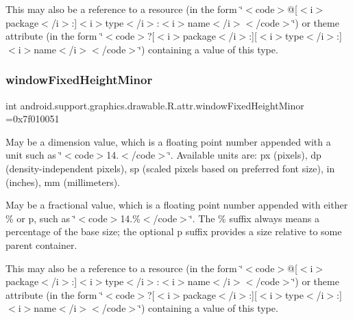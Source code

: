This may also be a reference to a resource (in the form \char`\"{}$<$code$>$@\mbox{[}$<$i$>$package$<$/i$>$\+:\mbox{]}$<$i$>$type$<$/i$>$\+:$<$i$>$name$<$/i$>$$<$/code$>$\char`\"{}) or theme attribute (in the form \char`\"{}$<$code$>$?\mbox{[}$<$i$>$package$<$/i$>$\+:\mbox{]}\mbox{[}$<$i$>$type$<$/i$>$\+:\mbox{]}$<$i$>$name$<$/i$>$$<$/code$>$\char`\"{}) containing a value of this type. \mbox{\label{classandroid_1_1support_1_1graphics_1_1drawable_1_1R_1_1attr_a25c1b23c8a0087d93b397eab05c67450}} 
\subsubsection{\texorpdfstring{window\+Fixed\+Height\+Minor}{windowFixedHeightMinor}}
{\footnotesize\ttfamily int android.\+support.\+graphics.\+drawable.\+R.\+attr.\+window\+Fixed\+Height\+Minor =0x7f010051\hspace{0.3cm}{\ttfamily [static]}}

May be a dimension value, which is a floating point number appended with a unit such as \char`\"{}$<$code$>$14.\+5sp$<$/code$>$\char`\"{}. Available units are\+: px (pixels), dp (density-\/independent pixels), sp (scaled pixels based on preferred font size), in (inches), mm (millimeters). 

May be a fractional value, which is a floating point number appended with either \% or p, such as \char`\"{}$<$code$>$14.\%$<$/code$>$\char`\"{}. The \% suffix always means a percentage of the base size; the optional p suffix provides a size relative to some parent container. 

This may also be a reference to a resource (in the form \char`\"{}$<$code$>$@\mbox{[}$<$i$>$package$<$/i$>$\+:\mbox{]}$<$i$>$type$<$/i$>$\+:$<$i$>$name$<$/i$>$$<$/code$>$\char`\"{}) or theme attribute (in the form \char`\"{}$<$code$>$?\mbox{[}$<$i$>$package$<$/i$>$\+:\mbox{]}\mbox{[}$<$i$>$type$<$/i$>$\+:\mbox{]}$<$i$>$name$<$/i$>$$<$/code$>$\char`\"{}) containing a value of this type. \mbox{\label{classandroid_1_1support_1_1graphics_1_1drawable_1_1R_1_1attr_aa1b4ec15b6d5a74fafabce88f3a9e0ba}} 
